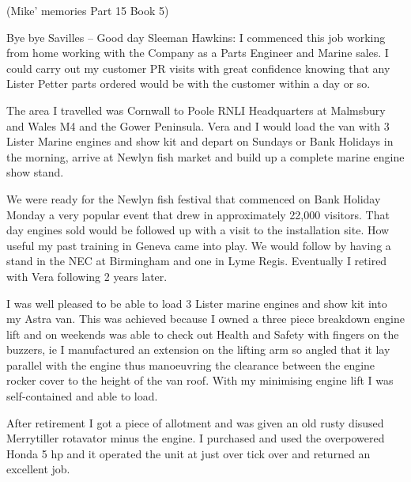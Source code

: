(Mike' memories Part 15 Book 5)

Bye bye Savilles – Good day Sleeman Hawkins:  I commenced this job working from
home working with the Company as a Parts Engineer and Marine sales.  I could
carry out my customer PR visits with great confidence knowing that any Lister
Petter parts ordered would be with the customer within a day or so.

The area I travelled was Cornwall to Poole RNLI Headquarters at Malmsbury and
Wales M4 and the Gower Peninsula.  Vera and I would load the van with 3 Lister
Marine engines and show kit and depart on Sundays or Bank Holidays in the
morning, arrive at Newlyn fish market and build up a complete marine engine
show stand.

We were ready for the Newlyn fish festival that commenced on Bank Holiday Monday
a very popular event that drew in approximately 22,000 visitors.  That day
engines sold would be followed up with a visit to the installation site.  How
useful my past training in Geneva came into play.  We would follow by having a
stand in the NEC at Birmingham and one in Lyme Regis.  Eventually I retired
with Vera following 2 years later.

I was well pleased to be able to load 3 Lister marine engines and show kit into
my Astra van.  This was achieved because I owned a three piece breakdown engine
lift and on weekends was able to check out Health and Safety with fingers on
the buzzers, ie I manufactured an extension on the lifting arm so angled that
it lay parallel with the engine thus manoeuvring the clearance between the
engine rocker cover to the height of the van roof.  With my minimising engine
lift I was self-contained and able to load.

After retirement I got a piece of allotment and was given an old rusty disused
Merrytiller rotavator minus the engine.  I purchased and used the overpowered
Honda 5 hp and it operated the unit at just over tick over and returned an
excellent job.

